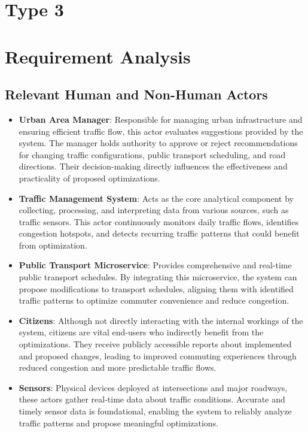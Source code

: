\documentclass[a4paper,12pt]{article}
\begin{document}
\newpage

\section*{Type 3}

\section{Requirement Analysis}
\subsection{Relevant Human and Non-Human Actors}
\begin{itemize}
    \item \textbf{Urban Area Manager}: Responsible for managing urban infrastructure and ensuring efficient traffic flow, this actor evaluates suggestions provided by the system. The manager holds authority to approve or reject recommendations for changing traffic configurations, public transport scheduling, and road directions. Their decision-making directly influences the effectiveness and practicality of proposed optimizations.
    \item \textbf{Traffic Management System}: Acts as the core analytical component by collecting, processing, and interpreting data from various sources, such as traffic sensors. This actor continuously monitors daily traffic flows, identifies congestion hotspots, and detects recurring traffic patterns that could benefit from optimization.
    \item \textbf{Public Transport Microservice}: Provides comprehensive and real-time public transport schedules. By integrating this microservice, the system can propose modifications to transport schedules, aligning them with identified traffic patterns to optimize commuter convenience and reduce congestion.
    \item \textbf{Citizens}: Although not directly interacting with the internal workings of the system, citizens are vital end-users who indirectly benefit from the optimizations. They receive publicly accessible reports about implemented and proposed changes, leading to improved commuting experiences through reduced congestion and more predictable traffic flows.
    \item \textbf{Sensors}: Physical devices deployed at intersections and major roadways, these actors gather real-time data about traffic conditions. Accurate and timely sensor data is foundational, enabling the system to reliably analyze traffic patterns and propose meaningful optimizations.
\end{itemize}
\end{document}
